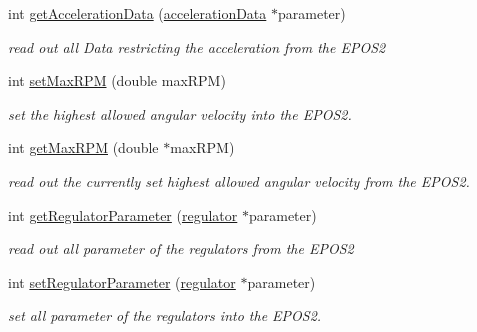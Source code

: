 \begin{DoxyCompactItemize}
int \hyperlink{classEpos2MotorController_a1ada66b97fd8437591696824080ce434}{get\-Acceleration\-Data} (\hyperlink{structEpos2MotorController_1_1accelerationData}{acceleration\-Data} $\ast$parameter)
\begin{DoxyCompactList}\small\item\em read out all Data restricting the acceleration from the E\-P\-O\-S2 \end{DoxyCompactList}\item 
int \hyperlink{classEpos2MotorController_a60d132d6d79c0b8d49eb5ed721aae790}{set\-Max\-R\-P\-M} (double max\-R\-P\-M)
\begin{DoxyCompactList}\small\item\em set the highest allowed angular velocity into the E\-P\-O\-S2. \end{DoxyCompactList}\item 
int \hyperlink{classEpos2MotorController_ae363c85bc1e9dbad81fd49b06d783ff9}{get\-Max\-R\-P\-M} (double $\ast$max\-R\-P\-M)
\begin{DoxyCompactList}\small\item\em read out the currently set highest allowed angular velocity from the E\-P\-O\-S2. \end{DoxyCompactList}\item 
int \hyperlink{classEpos2MotorController_a84b2544d4e3facf75ae12a526da2735d}{get\-Regulator\-Parameter} (\hyperlink{structEpos2MotorController_1_1regulator}{regulator} $\ast$parameter)
\begin{DoxyCompactList}\small\item\em read out all parameter of the regulators from the E\-P\-O\-S2 \end{DoxyCompactList}\item 
int \hyperlink{classEpos2MotorController_a42c80ac11a2d4dfcb4f75a573e017164}{set\-Regulator\-Parameter} (\hyperlink{structEpos2MotorController_1_1regulator}{regulator} $\ast$parameter)
\begin{DoxyCompactList}\small\item\em set all parameter of the regulators into the E\-P\-O\-S2. \end{DoxyCompactList}\end{DoxyCompactItemize}
